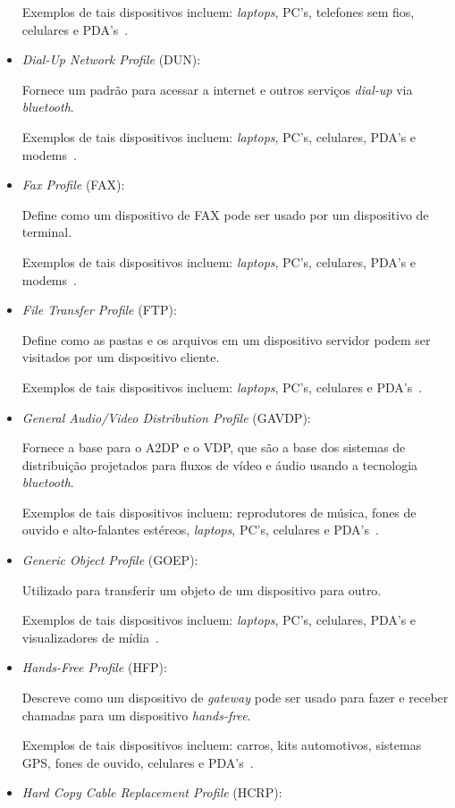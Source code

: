 \begin{itemize}
	Exemplos de tais dispositivos incluem: \emph{laptops}, PC's, telefones sem fios, celulares e PDA's~\cite{bluetoothprofilesCTP}.
	\item \emph{Dial-Up Network Profile} (DUN): 

	Fornece um padrão para acessar a internet e outros serviços \emph{dial-up} via \emph{bluetooth}.

	Exemplos de tais dispositivos incluem: \emph{laptops}, PC's, celulares, PDA's e modems~\cite{bluetoothprofilesDUN}.
	\item \emph{Fax Profile} (FAX): 

	Define como um dispositivo de FAX pode ser usado por um dispositivo de terminal.

	Exemplos de tais dispositivos incluem: \emph{laptops}, PC's, celulares, PDA's e modems~\cite{bluetoothprofilesFAX}.
	\item \emph{File Transfer Profile} (FTP): 

	Define como as pastas e os arquivos em um dispositivo servidor podem ser visitados por um dispositivo cliente.

	Exemplos de tais dispositivos incluem: \emph{laptops}, PC's, celulares e PDA's~\cite{bluetoothprofilesFTP}.
	\item \emph{General Audio/Video Distribution Profile} (GAVDP): 

	Fornece a base para o A2DP e o VDP, que são a base dos sistemas de distribuição projetados para fluxos de vídeo e áudio usando a tecnologia \emph{bluetooth}.

	Exemplos de tais dispositivos incluem: reprodutores de música, fones de ouvido e alto-falantes estéreos, \emph{laptops}, PC's, celulares e PDA's~\cite{bluetoothprofilesGAVDP}.
	\item \emph{Generic Object Profile} (GOEP): 

	Utilizado para transferir um objeto de um dispositivo para outro.

	Exemplos de tais dispositivos incluem: \emph{laptops}, PC's, celulares, PDA's e visualizadores de mídia~\cite{bluetoothprofilesGOEP}.
	\item \emph{Hands-Free Profile} (HFP): 

	Descreve como um dispositivo de \emph{gateway} pode ser usado para fazer e receber chamadas para um dispositivo \emph{hands-free}.

	Exemplos de tais dispositivos incluem: carros, kits automotivos, sistemas GPS, fones de ouvido, celulares e PDA's~\cite{bluetoothprofilesHFP}.
	\item \emph{Hard Copy Cable Replacement Profile} (HCRP): 


\end{itemize}
